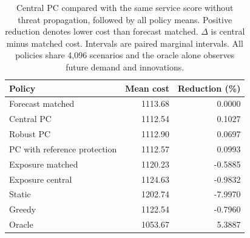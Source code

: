 \documentclass[journal]{IEEEtran}
\newcommand{\DIFnewtablecolor}{\color{blue}}
\begin{document}
\begin{table}[t]\DIFnewtablecolor
\centering
\caption{Central PC compared with the same service score without threat propagation, followed by all policy means. Positive reduction denotes lower cost than forecast matched. $\Delta$ is central minus matched cost. Intervals are paired marginal intervals. All policies share 4,096 scenarios and the oracle alone observes future demand and innovations.}
\label{tab:robust-boulder}
\footnotesize
\setlength{\tabcolsep}{3pt}
\vspace{3pt}
\begin{tabular}{@{}lrr@{}}
\toprule
Policy & Mean cost & Reduction (\%) \\
\midrule
Forecast matched & 1113.68 & 0.0000 \\
Central PC & 1112.54 & 0.1027 \\
Robust PC & 1112.90 & 0.0697 \\
PC with reference protection & 1112.57 & 0.0993 \\
Exposure matched & 1120.23 & -0.5885 \\
Exposure central & 1124.63 & -0.9832 \\
Static & 1202.74 & -7.9970 \\
Greedy & 1122.54 & -0.7960 \\
Oracle & 1053.67 & 5.3887 \\
\bottomrule
\end{tabular}
\end{table}
\end{document}

